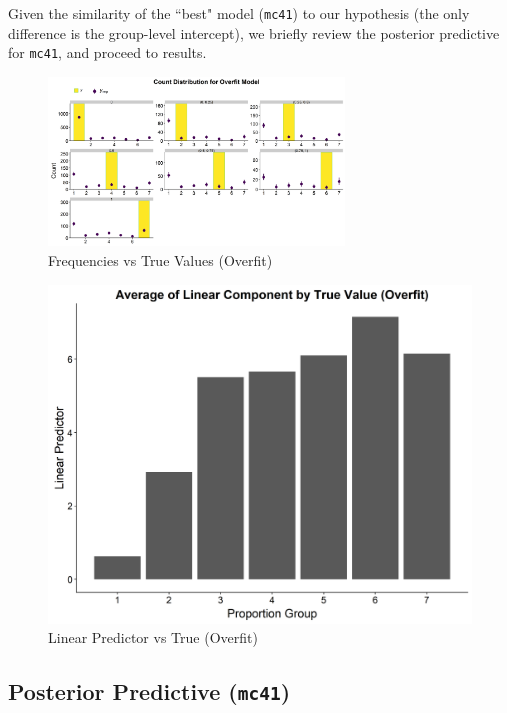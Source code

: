 \documentclass[11pt,twoside]{article}
\numberwithin{Theorem}{section}
\numberwithin{Definition}{section}
\numberwithin{Lemma}{section}
\numberwithin{Algorithm}{section}
\numberwithin{equation}{section}
\begin{document}
Given the similarity of the ``best" model (\texttt{mc41}) to our hypothesis (the only difference is the group-level intercept), we briefly review the posterior predictive for \texttt{mc41}, and proceed to results.


\begin{figure}[h!]
	\centering
	\includegraphics[width = 0.7\textwidth, height = 0.37\textheight]{Figures/3_2_Overfit_Preds.png}
	\caption{Frequencies vs True Values (Overfit)} \label{fig::3_Overfit_PredPlot}	
\end{figure}

\begin{figure}[h!]
	\centering
	\includegraphics[height = 0.4\textheight]{Figures/3_2_Overfit_LinPreds.png}
	\caption{Linear Predictor vs True (Overfit)} \label{fig::3_Overfit_LinPredPlot}	
\end{figure}



\clearpage

\newpage
\subsection{Posterior Predictive (\texttt{mc41})}
\end{document}
